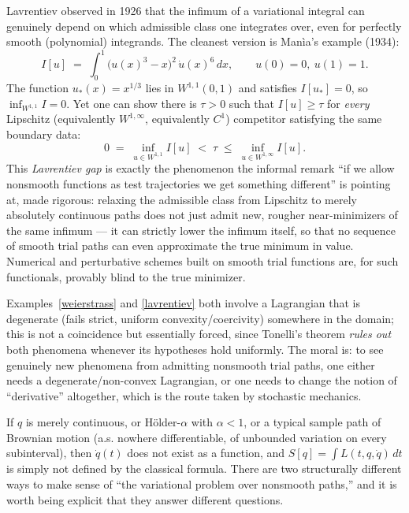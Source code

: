 \begin{example}
\label{lavrentiev}
Lavrentiev observed in 1926 that the infimum of a variational integral can
    genuinely depend on which admissible class one integrates over, even for
    perfectly smooth (polynomial) integrands. The cleanest version is Man\`ia's
    example (1934):
\[
I[u] \;=\; \int_0^1 \bigl(u(x)^3-x\bigr)^2\, \dot u(x)^6\, dx, \qquad u(0)=0,\ u(1)=1.
\]
The function $u_\ast(x)=x^{1/3}$ lies in $W^{1,1}(0,1)$ and satisfies
    $I[u_\ast]=0$, so $\inf_{W^{1,1}} I = 0$. Yet one can show there is
    $\tau>0$ such that $I[u]\ge \tau$ for \emph{every} Lipschitz (equivalently
    $W^{1,\infty}$, equivalently $C^1$) competitor satisfying the same boundary
    data:
\[
0 \;=\; \inf_{u\in W^{1,1}} I[u] \;<\; \tau \;\le\; \inf_{u \in W^{1,\infty}} I[u].
\]
This \emph{Lavrentiev gap} is exactly the phenomenon the informal remark ``if
    we allow nonsmooth functions as test trajectories we get something
    different'' is pointing at, made rigorous: relaxing the admissible class
    from Lipschitz to merely absolutely continuous paths does not just admit
    new, rougher near-minimizers of the same infimum --- it can strictly lower
    the infimum itself, so that no sequence of smooth trial paths can even
    approximate the true minimum in value. Numerical and perturbative schemes
    built on smooth trial functions are, for such functionals, provably blind
    to the true minimizer.
\end{example}

Examples~\ref{weierstrass} and \ref{lavrentiev} both involve a Lagrangian
that is degenerate (fails strict, uniform convexity/coercivity) somewhere in
the domain; this is not a coincidence but essentially forced, since Tonelli's
theorem \emph{rules out} both phenomena whenever its hypotheses hold uniformly.
The moral is: to see genuinely new phenomena from
admitting nonsmooth trial paths, one either needs a degenerate/non-convex
Lagrangian, or one needs to change the notion of ``derivative'' altogether,
which is the route taken by stochastic mechanics.

If $q$ is merely continuous, or H\"older-$\alpha$ with $\alpha<1$, or a typical
sample path of Brownian motion (a.s. nowhere differentiable, of unbounded
variation on every subinterval), then $\dot q(t)$ does not exist as a function,
and $S[q]=\int L(t,q,\dot q)\,dt$ is simply not defined by the classical
formula. There are two structurally different ways to make sense of ``the
variational problem over nonsmooth paths,'' and it is worth being explicit that
they answer different questions.

